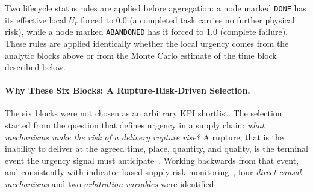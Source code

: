 Two lifecycle status rules are applied before aggregation: a node marked \texttt{DONE} has its effective local $U_r$ forced to $0.0$ (a completed task carries no further physical risk), while a node marked \texttt{ABANDONED} has it forced to $1.0$ (complete failure). These rules are applied identically whether the local urgency comes from the analytic blocks above or from the Monte Carlo estimate of the time block described below.

\paragraph{Why These Six Blocks: A Rupture-Risk-Driven Selection.}
The six blocks were not chosen as an arbitrary KPI shortlist. The selection started from the question that defines urgency in a supply chain: \emph{what mechanisms make the risk of a delivery rupture rise?} A rupture, that is the inability to deliver at the agreed time, place, quantity, and quality, is the terminal event the urgency signal must anticipate~\autocite{heckmann2015critical}. Working backwards from that event, and consistently with indicator-based supply risk monitoring~\autocite{mokhtar2019supplier}, four \emph{direct causal mechanisms} and two \emph{arbitration variables} were identified:

